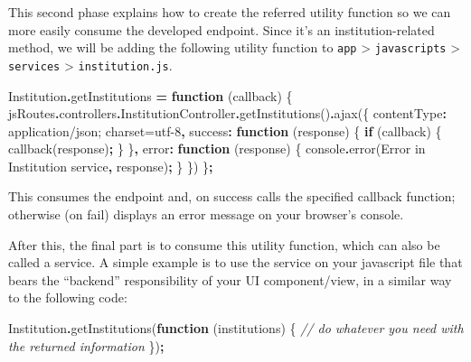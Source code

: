 \documentclass[
  11pt,
]{krantz}
\newenvironment{Shaded}{\begin{snugshade}}{\end{snugshade}}
\newcommand{\AttributeTok}[1]{\textcolor[rgb]{0.61,0.61,0.61}{#1}}
\newcommand{\BuiltInTok}[1]{#1}
\newcommand{\CommentTok}[1]{\textcolor[rgb]{0.37,0.37,0.37}{\textit{#1}}}
\newcommand{\ControlFlowTok}[1]{\textcolor[rgb]{0.27,0.27,0.27}{\textbf{#1}}}
\newcommand{\DataTypeTok}[1]{\textcolor[rgb]{0.27,0.27,0.27}{#1}}
\newcommand{\FunctionTok}[1]{\textcolor[rgb]{0,0,0}{#1}}
\newcommand{\KeywordTok}[1]{\textcolor[rgb]{0.27,0.27,0.27}{\textbf{#1}}}
\newcommand{\NormalTok}[1]{#1}
\newcommand{\OperatorTok}[1]{\textcolor[rgb]{0.43,0.43,0.43}{\textbf{#1}}}
\newcommand{\StringTok}[1]{\textcolor[rgb]{0.5,0.5,0.5}{#1}}
\begin{document}
This second phase explains how to create the referred utility function so we can more easily consume the developed endpoint. Since it's an institution-related method, we will be adding the following utility function to \texttt{app} \textgreater{} \texttt{javascripts} \textgreater{} \texttt{services} \textgreater{} \texttt{institution.js}.

\begin{Shaded}
\begin{Highlighting}[]
\NormalTok{Institution}\OperatorTok{.}\AttributeTok{getInstitutions} \OperatorTok{=} \KeywordTok{function}\NormalTok{ (callback) \{}
\NormalTok{    jsRoutes}\OperatorTok{.}\AttributeTok{controllers}\OperatorTok{.}\AttributeTok{InstitutionController}\OperatorTok{.}\FunctionTok{getInstitutions}\NormalTok{()}\OperatorTok{.}\FunctionTok{ajax}\NormalTok{(\{}
    \DataTypeTok{contentType}\OperatorTok{:} \StringTok{\textquotesingle{}application/json; charset=utf{-}8\textquotesingle{}}\OperatorTok{,}
        \DataTypeTok{success}\OperatorTok{:} \KeywordTok{function}\NormalTok{ (response) \{}
            \ControlFlowTok{if}\NormalTok{ (callback) \{}
                \FunctionTok{callback}\NormalTok{(response)}\OperatorTok{;}
\NormalTok{            \}}
\NormalTok{        \}}\OperatorTok{,}
        \DataTypeTok{error}\OperatorTok{:} \KeywordTok{function}\NormalTok{ (response) \{}
            \BuiltInTok{console}\OperatorTok{.}\FunctionTok{error}\NormalTok{(}\StringTok{\textquotesingle{}Error in Institution service\textquotesingle{}}\OperatorTok{,}\NormalTok{ response)}\OperatorTok{;}
\NormalTok{        \}}
\NormalTok{    \})}
\NormalTok{ \}}\OperatorTok{;}
\end{Highlighting}
\end{Shaded}

This consumes the endpoint and, on success calls the specified callback function; otherwise (on fail) displays an error message on your browser's console.

After this, the final part is to consume this utility function, which can also be called a service. A simple example is to use the service on your javascript file that bears the ``backend'' responsibility of your UI component/view, in a similar way to the following code:

\begin{Shaded}
\begin{Highlighting}[]
\NormalTok{Institution}\OperatorTok{.}\FunctionTok{getInstitutions}\NormalTok{(}\KeywordTok{function}\NormalTok{ (institutions) \{}
    \CommentTok{// do whatever you need with the returned information}
\NormalTok{\})}\OperatorTok{;}
\end{Highlighting}
\end{Shaded}
\end{document}
